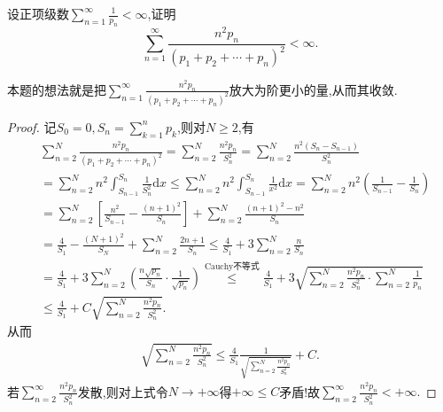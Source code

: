 \documentclass[../../main.tex]{subfiles}%
\begin{document}
\begin{example}
设正项级数$\sum\limits_{n=1}^\infty \frac{1}{p_n}<\infty$,证明
$$\sum_{n=1}^\infty \frac{n^2 p_n}{(p_1+p_2+\cdots +p_n)^2}<\infty.$$
\end{example}
\begin{remark}
本题的想法就是把$\sum\limits_{n=1}^\infty \frac{n^2 p_n}{(p_1+p_2+\cdots +p_n)^2}$放大为阶更小的量,从而其收敛.
\end{remark}
\begin{proof}
记$S_0=0,S_n=\sum_{k=1}^n{p_k}$,则对$N\geqslant 2$,有
\begin{align*}
&\sum_{n=2}^N{\frac{n^2p_n}{(p_1+p_2+\cdots +p_n)^2}}=\sum_{n=2}^N{\frac{n^2p_n}{S_{n}^{2}}}=\sum_{n=2}^N{\frac{n^2\left( S_n-S_{n-1} \right)}{S_{n}^{2}}} \\
&=\sum_{n=2}^N{n^2\int_{S_{n-1}}^{S_n}{\frac{1}{S_{n}^{2}}\mathrm{d}x}}\leqslant \sum_{n=2}^N{n^2\int_{S_{n-1}}^{S_n}{\frac{1}{x^2}\mathrm{d}x}}=\sum_{n=2}^N{n^2\left( \frac{1}{S_{n-1}}-\frac{1}{S_n} \right)} \\
&=\sum_{n=2}^N{\left[ \frac{n^2}{S_{n-1}}-\frac{\left( n+1 \right) ^2}{S_n} \right]}+\sum_{n=2}^N{\frac{\left( n+1 \right) ^2-n^2}{S_n}} \\
&=\frac{4}{S_1}-\frac{\left( N+1 \right) ^2}{S_N}+\sum_{n=2}^N{\frac{2n+1}{S_n}} 
\leqslant \frac{4}{S_1}+3\sum_{n=2}^N{\frac{n}{S_n}}\\
&=\frac{4}{S_1}+3\sum_{n=2}^N{\left( \frac{n\sqrt{p_n}}{S_n}\cdot \frac{1}{\sqrt{p_n}} \right)} \overset{\text{Cauchy不等式}}{\leqslant}\frac{4}{S_1}+3\sqrt{\sum_{n=2}^N{\frac{n^2p_n}{S_{n}^{2}}}\cdot \sum_{n=2}^N{\frac{1}{p_n}}} \\
&\leqslant \frac{4}{S_1}+C\sqrt{\sum_{n=2}^N{\frac{n^2p_n}{S_{n}^{2}}}}.
\end{align*}
从而
\begin{align*}
\sqrt{\sum_{n=2}^N{\frac{n^2p_n}{S_{n}^{2}}}}\leqslant \frac{4}{S_1}\frac{1}{\sqrt{\sum\limits_{n=2}^N{\frac{n^2p_n}{S_{n}^{2}}}}}+C.
\end{align*}
若$\sum_{n=2}^{\infty}{\frac{n^2p_n}{S_{n}^{2}}}$发散,则对上式令$N\rightarrow +\infty$得$+\infty \leqslant C$矛盾!故$\sum_{n=2}^{\infty}{\frac{n^2p_n}{S_{n}^{2}}}<+\infty .$
\end{proof}
\end{document}

